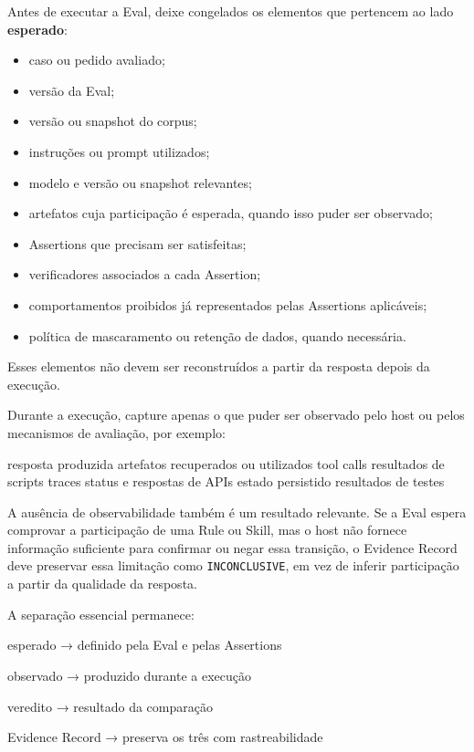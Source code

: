 \documentclass[
  10pt,
  a4paper,
  oneside]{book}
\newenvironment{Shaded}{}{}
\newcommand{\NormalTok}[1]{#1}
\providecommand{\tightlist}{%
  \setlength{\itemsep}{0pt}\setlength{\parskip}{0pt}}
\renewenvironment{Shaded}{\begin{snugshade}}{\end{snugshade}}%
\begin{document}
Antes de executar a Eval, deixe congelados os elementos que pertencem ao
lado \textbf{esperado}:

\begin{itemize}
\tightlist
\item
  caso ou pedido avaliado;
\item
  versão da Eval;
\item
  versão ou snapshot do corpus;
\item
  instruções ou prompt utilizados;
\item
  modelo e versão ou snapshot relevantes;
\item
  artefatos cuja participação é esperada, quando isso puder ser
  observado;
\item
  Assertions que precisam ser satisfeitas;
\item
  verificadores associados a cada Assertion;
\item
  comportamentos proibidos já representados pelas Assertions aplicáveis;
\item
  política de mascaramento ou retenção de dados, quando necessária.
\end{itemize}

Esses elementos não devem ser reconstruídos a partir da resposta depois
da execução.

Durante a execução, capture apenas o que puder ser observado pelo host
ou pelos mecanismos de avaliação, por exemplo:

\begin{Shaded}
\begin{Highlighting}[]
\NormalTok{resposta produzida}
\NormalTok{artefatos recuperados ou utilizados}
\NormalTok{tool calls}
\NormalTok{resultados de scripts}
\NormalTok{traces}
\NormalTok{status e respostas de APIs}
\NormalTok{estado persistido}
\NormalTok{resultados de testes}
\end{Highlighting}
\end{Shaded}

A ausência de observabilidade também é um resultado relevante. Se a Eval
espera comprovar a participação de uma Rule ou Skill, mas o host não
fornece informação suficiente para confirmar ou negar essa transição, o
Evidence Record deve preservar essa limitação como
\texttt{INCONCLUSIVE}, em vez de inferir participação a partir da
qualidade da resposta.

A separação essencial permanece:

\begin{Shaded}
\begin{Highlighting}[]
\NormalTok{esperado}
\NormalTok{→ definido pela Eval e pelas Assertions}

\NormalTok{observado}
\NormalTok{→ produzido durante a execução}

\NormalTok{veredito}
\NormalTok{→ resultado da comparação}

\NormalTok{Evidence Record}
\NormalTok{→ preserva os três com rastreabilidade}
\end{Highlighting}
\end{Shaded}
\end{document}
